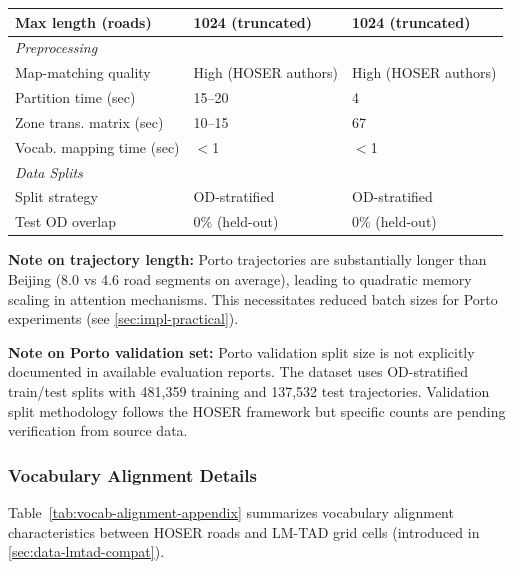 \begin{table}[H]
\begin{tabular}{lll}
        \quad Max length (roads)        & 1024 (truncated)        & 1024 (truncated)      \\
        \midrule
        \multicolumn{3}{l}{\textit{Preprocessing}}                                   \\
        \quad Map-matching quality      & High (HOSER authors)    & High (HOSER authors)  \\
        \quad Partition time (sec)      & 15--20                  & 4                     \\
        \quad Zone trans. matrix (sec)  & 10--15                  & 67                    \\
        \quad Vocab. mapping time (sec) & $<$1                    & $<$1                  \\
        \midrule
        \multicolumn{3}{l}{\textit{Data Splits}}                                     \\
        \quad Split strategy            & OD-stratified           & OD-stratified         \\
        \quad Test OD overlap           & 0\% (held-out)          & 0\% (held-out)        \\
        \bottomrule
    \end{tabular}
\end{table}

\textbf{Note on trajectory length:} Porto trajectories are substantially longer than Beijing (8.0 vs 4.6 road segments on average), leading to quadratic memory scaling in attention mechanisms. This necessitates reduced batch sizes for Porto experiments (see \autoref{sec:impl-practical}).

\textbf{Note on Porto validation set:} Porto validation split size is not explicitly documented in available evaluation reports. The dataset uses OD-stratified train/test splits with 481,359 training and 137,532 test trajectories. Validation split methodology follows the HOSER framework but specific counts are pending verification from source data.

\subsubsection{Vocabulary Alignment Details}
\label{app:vocab-stats}

Table~\ref{tab:vocab-alignment-appendix} summarizes vocabulary alignment characteristics between HOSER roads and LM-TAD grid cells (introduced in \autoref{sec:data-lmtad-compat}).

